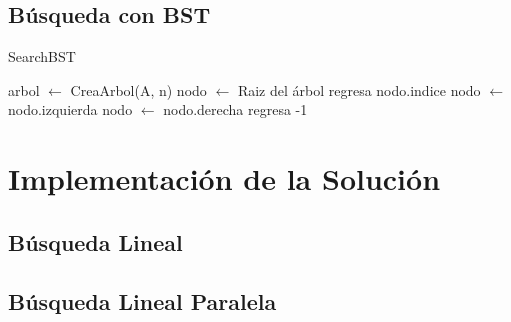 \documentclass[12pt, fleqn]{article}                             %
\theoremstyle{break}                                            %
\begin{document}
    \subsection{Búsqueda con BST}
        \begin{algorithm}[H]
        \caption{SearchBST}
        \begin{algorithmic}[1]
            \State arbol $\gets$ CreaArbol(A, n)
            \State nodo $\gets$ Raiz del árbol
                    \State regresa nodo.indice
                \EndIf
                    \State nodo $\gets$ nodo.izquierda
                \EndIf
                    \State nodo $\gets$ nodo.derecha
                \EndIf
            \EndWhile
            \State regresa -1
            \EndProcedure
            \end{algorithmic}
        \end{algorithm}




\clearpage
\section{Implementación de la Solución}

    \clearpage
    \subsection{Búsqueda Lineal}

        

    \clearpage
    \subsection{Búsqueda Lineal Paralela}
        
\end{document}
